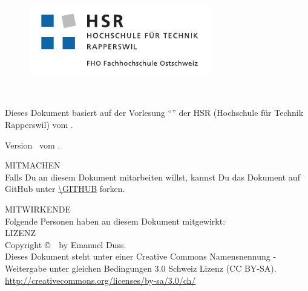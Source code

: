 %
%

\begin{titlepage}
  \thispagestyle{empty}
  \maketitle
  \vfill
  \begin{figure}[!htbp]
    \centering
    \includegraphics[width=300px]{hsr_logo.pdf}
  \end{figure}
\end{titlepage}

\thispagestyle{empty}
\SUBJECT \\
\TITLE

Dieses Dokument basiert auf der Vorlesung "`\TITLE"' der
HSR (Hochschule für Technik Rapperswil) vom \SEMESTER.

Version \REVISION~vom \REVISIONDATE.
\vfill

\uppercase{Mitmachen} \\
Falls Du an diesem Dokument mitarbeiten willst, kannst Du das Dokument
auf GitHub unter \url{\GITHUB} forken.

\uppercase{Mitwirkende} \\
Folgende Personen haben an diesem Dokument mitgewirkt: \\


\uppercase{Lizenz} \\
Copyright \copyright~\YEAR~by Emanuel Duss. \\
Dieses Dokument steht unter einer Creative Commons Namensnennung -
Weitergabe unter gleichen Bedingungen 3.0 Schweiz Lizenz (CC BY-SA). \\
\url{http://creativecommons.org/licenses/by-sa/3.0/ch/}

{\huge \ccbysa}

\setcounter{page}{1}
\tableofcontents

